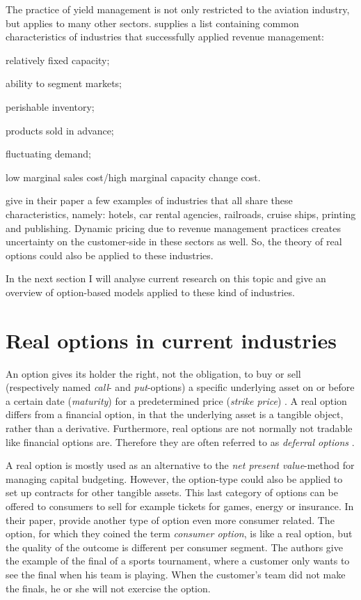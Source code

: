 The practice of yield management is not only restricted to the aviation industry, but applies to many other sectors.  supplies a list containing common characteristics of industries that successfully applied revenue management:
\begin{compactitem}
\item relatively fixed capacity;
\item ability to segment markets;
\item perishable inventory;
\item products sold in advance;
\item fluctuating demand;
\item low marginal sales cost/high marginal capacity change cost.
\vspace{1ex}
\end{compactitem}

 give in their paper a few examples of industries that all share these characteristics, namely: hotels, car rental agencies, railroads, cruise ships, printing and publishing. Dynamic pricing due to revenue management practices creates uncertainty on the customer-side in these sectors as well. So, the theory of real options could also be applied to these industries.

In the next section I will analyse current research on this topic and give an over\-view of option-based models applied to these kind of industries.

\section{Real options in current industries}
An option gives its holder the right, not the obligation, to buy or sell (respectively named \emph{call}- and \emph{put}-options) a specific underlying asset on or before a certain date (\emph{maturity}) for a predetermined price (\emph{strike price}) \cite{hull99}. A real option differs from a financial option, in that the underlying asset is a tangible object, rather than a derivative. Furthermore, real options are not normally not tradable like financial options are. Therefore they are often referred to as \emph{deferral options} \cite{jain11}.

A real option is mostly used as an alternative to the \emph{net present value}-method for managing capital budgeting. However, the option-type could also be applied to set up contracts for other tangible assets. This last category of options can be offered to consumers to sell for example tickets for games, energy or insurance. In their paper,  provide another type of option even more consumer related. The option, for which they coined the term \emph{consumer option}, is like a real option, but the quality of the outcome is different per consumer segment. The authors give the example of the final of a sports tournament, where a customer only wants to see the final when his team is playing. When the customer's team did not make the finals, he or she will not exercise the option.

